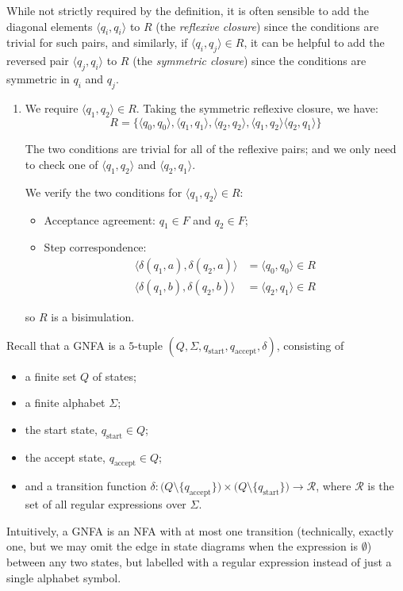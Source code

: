 \documentclass{article}
\theoremstyle{definition}
\theoremstyle{definition}
\theoremstyle{remark}
\begin{document}
While not strictly required by the definition, it is often sensible to add the diagonal elements $\langle q_i,q_i\rangle$ to $R$ (the \textit{reflexive closure}) since the conditions are trivial for such pairs, and similarly, if $\langle q_i,q_j\rangle\in R$, it can be helpful to add the reversed pair $\langle q_j,q_i\rangle$ to $R$ (the \textit{symmetric closure}) since the conditions are symmetric in $q_i$ and $q_j$.


\begin{enumerate}
    \item[$(i)$] We require $\langle q_1,q_2\rangle\in R$. Taking the symmetric reflexive closure, we have:
    \begin{equation*}
        R=\bigl\{\langle q_0,q_0\rangle,\langle q_1,q_1\rangle,\langle q_2,q_2\rangle,\langle q_1,q_2\rangle\langle q_2,q_1\rangle\bigr\}
    \end{equation*}

    The two conditions are trivial for all of the reflexive pairs; and we only need to check one of $\langle q_1,q_2\rangle$ and $\langle q_2,q_1\rangle$.
    
    We verify the two conditions for $\langle q_1,q_2\rangle\in R$:
    \begin{itemize}
        \item Acceptance agreement: $q_1\in F$ and $q_2\in F$;
        
        \item Step correspondence:
        \begin{align*}
            \bigl\langle\delta(q_1,a),\delta(q_2,a)\bigr\rangle&=\langle q_0,q_0\rangle\in R\\
            \bigl\langle\delta(q_1,b),\delta(q_2,b)\bigr\rangle&=\langle q_2,q_1\rangle\in R
        \end{align*}
    \end{itemize}
    so $R$ is a bisimulation.
\end{enumerate}


\bigskip

Recall that a GNFA is a $5$-tuple $(Q,\Sigma,q_\text{start},q_\text{accept},\delta)$, consisting of
\begin{itemize}
    \item a finite set $Q$ of states;
    \item a finite alphabet $\Sigma$;
    \item the start state, $q_\text{start}\in Q$;
    \item the accept state, $q_\text{accept}\in Q$;
    \item and a transition function $\delta:\bigl(Q\setminus\{q_\text{accept}\}\bigr)\times\bigl(Q\setminus\{q_\text{start}\}\bigr)\rightarrow\mathcal{R}$, where $\mathcal{R}$ is the set of all regular expressions over $\Sigma$.
\end{itemize}
Intuitively, a GNFA is an NFA with at most one transition (technically, exactly one, but we may omit the edge in state diagrams when the expression is $\emptyset$) between any two states, but labelled with a regular expression instead of just a single alphabet symbol.
\end{document}
